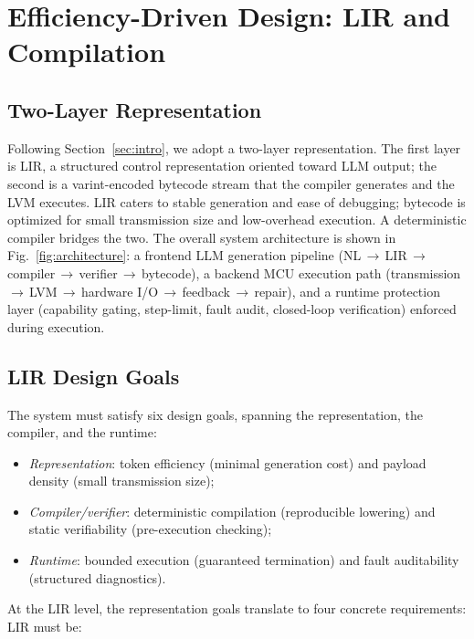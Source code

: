 \documentclass[a4paper,fleqn,longmktitle]{cas-dc}
\begin{document}
\section{Efficiency-Driven Design: LIR and Compilation}
\label{sec:lir}

\subsection{Two-Layer Representation}
\label{sec:two_layer}

Following Section~\ref{sec:intro}, we adopt a two-layer representation. The first layer is LIR, a structured control representation oriented toward LLM output; the second is a varint-encoded bytecode stream that the compiler generates and the LVM executes. LIR caters to stable generation and ease of debugging; bytecode is optimized for small transmission size and low-overhead execution. A deterministic compiler bridges the two. The overall system architecture is shown in Fig.~\ref{fig:architecture}: a frontend LLM generation pipeline (NL\,$\to$\,LIR\,$\to$\,compiler\,$\to$\,verifier\,$\to$\,bytecode), a backend MCU execution path (transmission\,$\to$\,LVM\,$\to$\,hardware I/O\,$\to$\,feedback\,$\to$\,repair), and a runtime protection layer (capability gating, step-limit, fault audit, closed-loop verification) enforced during execution.

\subsection{LIR Design Goals}
\label{sec:lir_goals}

The system must satisfy six design goals, spanning the representation, the compiler, and the runtime:
\begin{itemize}[nosep,leftmargin=1.5em]
  \item \emph{Representation}: token efficiency (minimal generation cost) and payload density (small transmission size);
  \item \emph{Compiler/verifier}: deterministic compilation (reproducible lowering) and static verifiability (pre-execution checking);
  \item \emph{Runtime}: bounded execution (guaranteed termination) and fault auditability (structured diagnostics).
\end{itemize}
At the LIR level, the representation goals translate to four concrete requirements: LIR must be:
\end{document}
